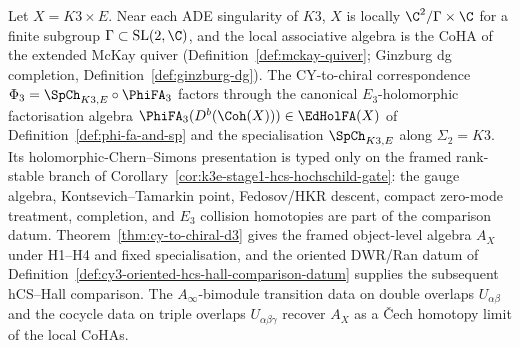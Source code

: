 Let $X = K3 \times E$. Near each ADE singularity of $K3$, $X$ is locally $\C^2/\Gamma \times \C$ for a finite subgroup $\Gamma \subset \mathrm{SL}(2,\C)$, and the local associative algebra is the CoHA of the extended McKay quiver (Definition~\ref{def:mckay-quiver}; Ginzburg dg completion, Definition~\ref{def:ginzburg-dg}). The CY-to-chiral correspondence $\Phi_3 = \SpCh_{K3, E} \circ \PhiFA_3$ factors through the canonical $E_3$-holomorphic factorisation algebra $\PhiFA_3(D^b(\Coh(X))) \in \EdHolFA(X)$ of Definition~\ref{def:phi-fa-and-sp} and the specialisation $\SpCh_{K3, E}$ along $\Sigma_2 = K3$. Its holomorphic-Chern--Simons presentation is typed only on the framed rank-stable branch of Corollary~\ref{cor:k3e-stage1-hcs-hochschild-gate}: the gauge algebra, Kontsevich--Tamarkin point, Fedosov/HKR descent, compact zero-mode treatment, completion, and $E_3$ collision homotopies are part of the comparison datum. Theorem~\ref{thm:cy-to-chiral-d3} gives the framed object-level algebra $A_X$ under H1--H4 and fixed specialisation, and the oriented DWR/Ran datum of Definition~\ref{def:cy3-oriented-hcs-hall-comparison-datum} supplies the subsequent hCS--Hall comparison. The $A_\infty$-bimodule transition data on double overlaps $U_{\alpha\beta}$ and the cocycle data on triple overlaps $U_{\alpha\beta\gamma}$ recover $A_X$ as a \v{C}ech homotopy limit of the local CoHAs.

